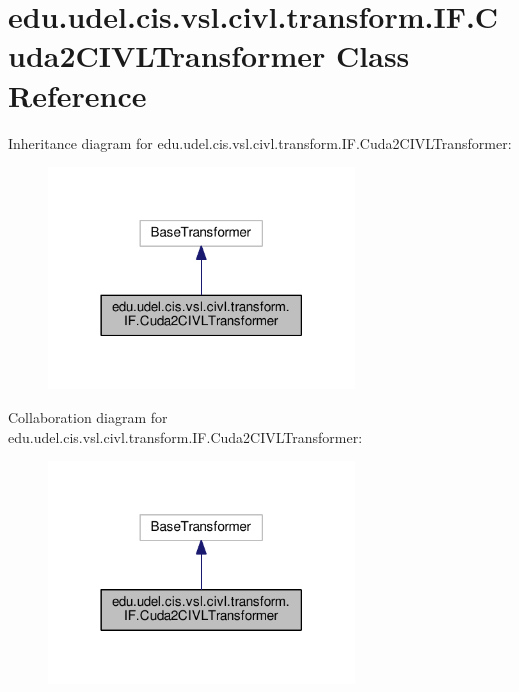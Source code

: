 \hypertarget{classedu_1_1udel_1_1cis_1_1vsl_1_1civl_1_1transform_1_1IF_1_1Cuda2CIVLTransformer}{}\section{edu.\+udel.\+cis.\+vsl.\+civl.\+transform.\+I\+F.\+Cuda2\+C\+I\+V\+L\+Transformer Class Reference}
\label{classedu_1_1udel_1_1cis_1_1vsl_1_1civl_1_1transform_1_1IF_1_1Cuda2CIVLTransformer}


Inheritance diagram for edu.\+udel.\+cis.\+vsl.\+civl.\+transform.\+I\+F.\+Cuda2\+C\+I\+V\+L\+Transformer\+:
\nopagebreak
\begin{figure}[H]
\begin{center}
\leavevmode
\includegraphics[width=230pt]{classedu_1_1udel_1_1cis_1_1vsl_1_1civl_1_1transform_1_1IF_1_1Cuda2CIVLTransformer__inherit__graph}
\end{center}
\end{figure}


Collaboration diagram for edu.\+udel.\+cis.\+vsl.\+civl.\+transform.\+I\+F.\+Cuda2\+C\+I\+V\+L\+Transformer\+:
\nopagebreak
\begin{figure}[H]
\begin{center}
\leavevmode
\includegraphics[width=230pt]{classedu_1_1udel_1_1cis_1_1vsl_1_1civl_1_1transform_1_1IF_1_1Cuda2CIVLTransformer__coll__graph}
\end{center}
\end{figure}
